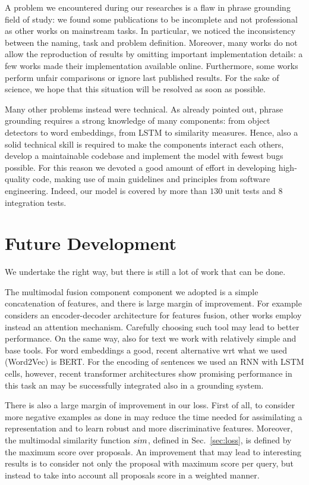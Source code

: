 A problem we encountered during our researches is a flaw in phrase
grounding field of study: we found some publications to be incomplete
and not professional as other works on mainstream tasks. In
particular, we noticed the inconsistency between the naming, task and
problem definition. Moreover, many works do not allow the reproduction
of results by omitting important implementation details: a few works
made their implementation available online. Furthermore, some works
perform unfair comparisons or ignore last published results. For the
sake of science, we hope that this situation will be resolved as soon
as possible.

Many other problems instead were technical. As already pointed out,
phrase grounding requires a strong knowledge of many components: from
object detectors to word embeddings, from LSTM to similarity measures.
Hence, also a solid technical skill is required to make the components
interact each others, develop a maintainable codebase and implement
the model with fewest bugs possible. For this reason we devoted a good
amount of effort in developing high-quality code, making use of main
guidelines and principles from software engineering. Indeed, our model
is covered by more than $130$ unit tests and $8$ integration tests.

\section{Future Development}

We undertake the right way, but there is still a lot of work that can
be done.

The multimodal fusion component component we adopted is a simple
concatenation of features, and there is large margin of improvement.
For example \cite{datta2019align2ground} considers an encoder-decoder
architecture for features fusion, other works employ instead an
attention mechanism. Carefully choosing such tool may lead to better
performance. On the same way, also for text we work with relatively
simple and base tools. For word embeddings a good, recent alternative
wrt what we used (Word2Vec) is BERT. For the encoding of sentences we
used an RNN with LSTM cells, however, recent transformer architectures
show promising performance in this task an may be successfully
integrated also in a grounding system.

There is also a large margin of improvement in our loss. First of all,
to consider more negative examples as done in \cite{wang2020maf} may
reduce the time needed for assimilating a representation and to learn
robust and more discriminative features. Moreover, the multimodal
similarity function $sim$, defined in Sec.~\ref{sec:loss}, is
defined by the maximum score over proposals. An improvement that may
lead to interesting results is to consider not only the proposal with
maximum score per query, but instead to take into account all
proposals score in a weighted manner.

